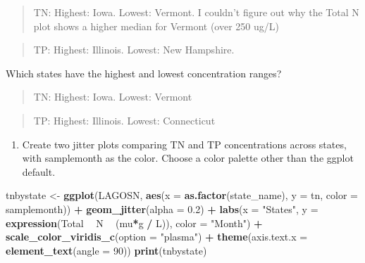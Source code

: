 \documentclass[]{article}
\newenvironment{Shaded}{\begin{snugshade}}{\end{snugshade}}
\newcommand{\DataTypeTok}[1]{\textcolor[rgb]{0.13,0.29,0.53}{#1}}
\newcommand{\DecValTok}[1]{\textcolor[rgb]{0.00,0.00,0.81}{#1}}
\newcommand{\FloatTok}[1]{\textcolor[rgb]{0.00,0.00,0.81}{#1}}
\newcommand{\KeywordTok}[1]{\textcolor[rgb]{0.13,0.29,0.53}{\textbf{#1}}}
\newcommand{\NormalTok}[1]{#1}
\newcommand{\OperatorTok}[1]{\textcolor[rgb]{0.81,0.36,0.00}{\textbf{#1}}}
\newcommand{\StringTok}[1]{\textcolor[rgb]{0.31,0.60,0.02}{#1}}
\providecommand{\tightlist}{%
  \setlength{\itemsep}{0pt}\setlength{\parskip}{0pt}}
\begin{document}
\begin{quote}
TN: Highest: Iowa. Lowest: Vermont. I couldn't figure out why the Total
N plot shows a higher median for Vermont (over 250 ug/L)
\end{quote}

\begin{quote}
TP: Highest: Illinois. Lowest: New Hampshire.
\end{quote}

Which states have the highest and lowest concentration ranges?

\begin{quote}
TN: Highest: Iowa. Lowest: Vermont
\end{quote}

\begin{quote}
TP: Highest: Illinois. Lowest: Connecticut
\end{quote}

\begin{enumerate}
\def\labelenumi{\arabic{enumi}.}
\setcounter{enumi}{9}
\tightlist
\item
  Create two jitter plots comparing TN and TP concentrations across
  states, with samplemonth as the color. Choose a color palette other
  than the ggplot default.
\end{enumerate}

\begin{Shaded}
\begin{Highlighting}[]
\NormalTok{tnbystate <-}\StringTok{ }
\KeywordTok{ggplot}\NormalTok{(LAGOSN, }
       \KeywordTok{aes}\NormalTok{(}\DataTypeTok{x =} \KeywordTok{as.factor}\NormalTok{(state_name), }\DataTypeTok{y =}\NormalTok{ tn, }\DataTypeTok{color =}\NormalTok{ samplemonth)) }\OperatorTok{+}
\StringTok{  }\KeywordTok{geom_jitter}\NormalTok{(}\DataTypeTok{alpha =} \FloatTok{0.2}\NormalTok{) }\OperatorTok{+}
\StringTok{  }\KeywordTok{labs}\NormalTok{(}\DataTypeTok{x =} \StringTok{"States"}\NormalTok{, }\DataTypeTok{y =} \KeywordTok{expression}\NormalTok{(Total }\OperatorTok{~}\StringTok{ }\NormalTok{N }\OperatorTok{~}\StringTok{ }\NormalTok{(mu}\OperatorTok{*}\NormalTok{g }\OperatorTok{/}\StringTok{ }\NormalTok{L)), }\DataTypeTok{color =} \StringTok{"Month"}\NormalTok{) }\OperatorTok{+}
\StringTok{  }\KeywordTok{scale_color_viridis_c}\NormalTok{(}\DataTypeTok{option =} \StringTok{"plasma"}\NormalTok{) }\OperatorTok{+}
\StringTok{  }\KeywordTok{theme}\NormalTok{(}\DataTypeTok{axis.text.x =} \KeywordTok{element_text}\NormalTok{(}\DataTypeTok{angle =} \DecValTok{90}\NormalTok{))}
\KeywordTok{print}\NormalTok{(tnbystate)}
\end{Highlighting}
\end{Shaded}
\end{document}
